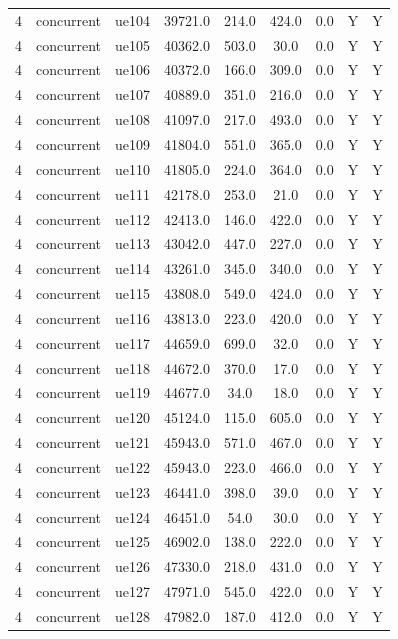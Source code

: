 \begin{table}[ht]
\begin{tabular}{|c|c|c|c|c|c|c|c|c|}
4 & concurrent & ue104 & 39721.0 & 214.0 & 424.0 & 0.0 & Y & Y \\
4 & concurrent & ue105 & 40362.0 & 503.0 & 30.0 & 0.0 & Y & Y \\
4 & concurrent & ue106 & 40372.0 & 166.0 & 309.0 & 0.0 & Y & Y \\
4 & concurrent & ue107 & 40889.0 & 351.0 & 216.0 & 0.0 & Y & Y \\
4 & concurrent & ue108 & 41097.0 & 217.0 & 493.0 & 0.0 & Y & Y \\
4 & concurrent & ue109 & 41804.0 & 551.0 & 365.0 & 0.0 & Y & Y \\
4 & concurrent & ue110 & 41805.0 & 224.0 & 364.0 & 0.0 & Y & Y \\
4 & concurrent & ue111 & 42178.0 & 253.0 & 21.0 & 0.0 & Y & Y \\
4 & concurrent & ue112 & 42413.0 & 146.0 & 422.0 & 0.0 & Y & Y \\
4 & concurrent & ue113 & 43042.0 & 447.0 & 227.0 & 0.0 & Y & Y \\
4 & concurrent & ue114 & 43261.0 & 345.0 & 340.0 & 0.0 & Y & Y \\
4 & concurrent & ue115 & 43808.0 & 549.0 & 424.0 & 0.0 & Y & Y \\
4 & concurrent & ue116 & 43813.0 & 223.0 & 420.0 & 0.0 & Y & Y \\
4 & concurrent & ue117 & 44659.0 & 699.0 & 32.0 & 0.0 & Y & Y \\
4 & concurrent & ue118 & 44672.0 & 370.0 & 17.0 & 0.0 & Y & Y \\
4 & concurrent & ue119 & 44677.0 & 34.0 & 18.0 & 0.0 & Y & Y \\
4 & concurrent & ue120 & 45124.0 & 115.0 & 605.0 & 0.0 & Y & Y \\
4 & concurrent & ue121 & 45943.0 & 571.0 & 467.0 & 0.0 & Y & Y \\
4 & concurrent & ue122 & 45943.0 & 223.0 & 466.0 & 0.0 & Y & Y \\
4 & concurrent & ue123 & 46441.0 & 398.0 & 39.0 & 0.0 & Y & Y \\
4 & concurrent & ue124 & 46451.0 & 54.0 & 30.0 & 0.0 & Y & Y \\
4 & concurrent & ue125 & 46902.0 & 138.0 & 222.0 & 0.0 & Y & Y \\
4 & concurrent & ue126 & 47330.0 & 218.0 & 431.0 & 0.0 & Y & Y \\
4 & concurrent & ue127 & 47971.0 & 545.0 & 422.0 & 0.0 & Y & Y \\
4 & concurrent & ue128 & 47982.0 & 187.0 & 412.0 & 0.0 & Y & Y \\

\end{tabular}
\end{table}
